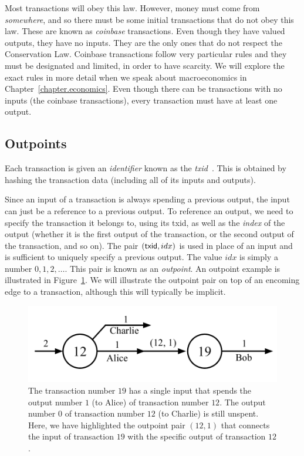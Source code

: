 Most transactions will obey this law. However, money must come from \emph{somewhere},
and so there must be some initial transactions that do not obey this law. These are known as
\emph{coinbase} transactions. Even though they have valued outputs, they have no inputs. They
are the only ones that do not respect the Conservation Law.
Coinbase transactions follow very particular rules and they must be designated and limited,
in order to have scarcity.
We will explore the exact rules
in more detail when we speak about macroeconomics in Chapter~\ref{chapter.economics}.
Even though there can be transactions with no inputs (the coinbase transactions), every
transaction must have at least one output.

\subsection*{Outpoints}

Each transaction is given an \emph{identifier} known as the \emph{txid}~. This is
obtained by hashing the transaction data (including all of its inputs and outputs).

Since an input of a transaction is always spending a previous output, the input can just be a
reference to a previous output. To reference an output, we need to specify the transaction it
belongs to, using its txid, as well as the \emph{index} of the output (whether it is the first
output of the transaction, or the second output of the transaction, and so on). The pair
$(\mathsf{txid}, idx)$ is used in place of an input and is sufficient to uniquely specify a previous
output. The value $idx$ is simply a number $0, 1, 2, \ldots$.
This pair is known as an \emph{outpoint}. An outpoint example is illustrated
in Figure~\ref{fig.utxo-outpoint}. We will illustrate the outpoint pair on top of an
encoming edge to a transaction, although this will typically be implicit.

\begin{figure}[h]
    \centering
    \includegraphics[width=0.65 \columnwidth,keepaspectratio]{figures/utxo-outpoint.pdf}
    \caption{The transaction number $19$ has a single input that spends the output number $1$ (to Alice)
             of transaction number $12$.
             The output number $0$ of transaction number $12$ (to Charlie) is still unspent.
             Here, we have highlighted the outpoint pair $(12, 1)$ that connects the input
             of transaction $19$ with the specific output of transaction $12$.}
    \label{fig.utxo-outpoint}
\end{figure}

